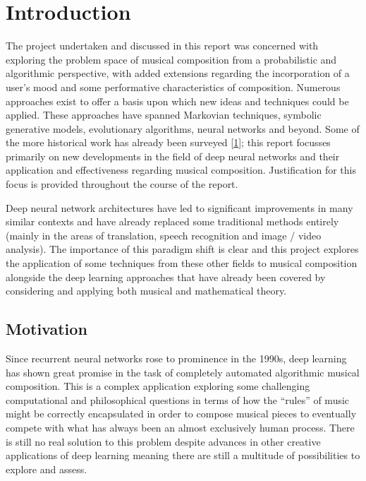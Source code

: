 \documentclass[12pt,]{article}
\begin{document}

\hypertarget{introduction}{%
\section{Introduction}\label{introduction}}

The project undertaken and discussed in this report was concerned with
exploring the problem space of musical composition from a probabilistic
and algorithmic perspective, with added extensions regarding the
incorporation of a user's mood and some performative characteristics of
composition. Numerous approaches exist to offer a basis upon which new
ideas and techniques could be applied. These approaches have spanned
Markovian techniques, symbolic generative models, evolutionary
algorithms, neural networks and beyond. Some of the more historical work
has already been surveyed
{[}\protect\hyperlink{ref-nierhaus2009algorithmic}{1}{]}; this report
focusses primarily on new developments in the field of deep neural
networks and their application and effectiveness regarding musical
composition. Justification for this focus is provided throughout the
course of the report.

Deep neural network architectures have led to significant improvements
in many similar contexts and have already replaced some traditional
methods entirely (mainly in the areas of translation, speech recognition
and image / video analysis). The importance of this paradigm shift is
clear and this project explores the application of some techniques from
these other fields to musical composition alongside the deep learning
approaches that have already been covered by considering and applying
both musical and mathematical theory.

\hypertarget{motivation}{%
\subsection{Motivation}\label{motivation}}

Since recurrent neural networks rose to prominence in the 1990s, deep
learning has shown great promise in the task of completely automated
algorithmic musical composition. This is a complex application exploring
some challenging computational and philosophical questions in terms of
how the ``rules'' of music might be correctly encapsulated in order to
compose musical pieces to eventually compete with what has always been
an almost exclusively human process. There is still no real solution to
this problem despite advances in other creative applications of deep
learning meaning there are still a multitude of possibilities to explore
and assess.
\end{document}
